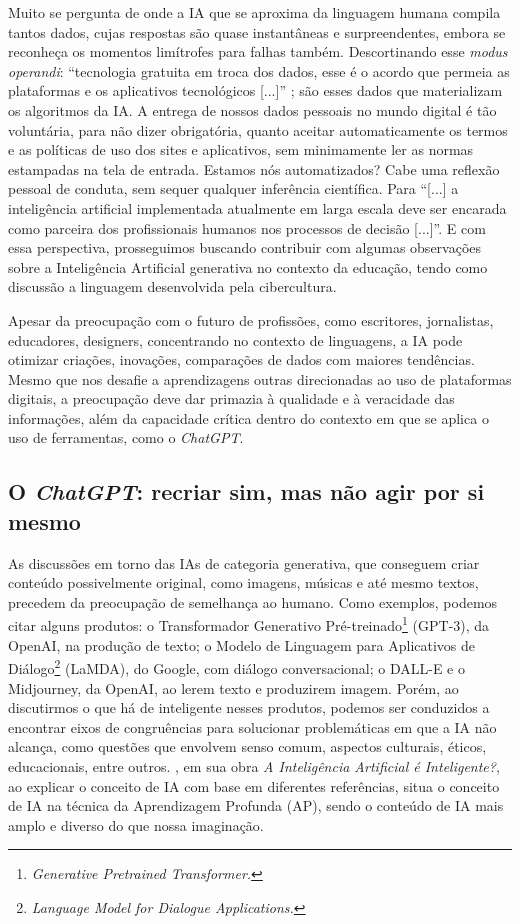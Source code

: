 \documentclass[portuguese]{textolivre}
\begin{document}
Muito se pergunta de onde a IA que se aproxima da linguagem humana compila tantos dados, cujas respostas são quase instantâneas e surpreendentes, embora se reconheça os momentos limítrofes para falhas também. Descortinando esse \emph{modus operandi}: “tecnologia gratuita em troca dos dados, esse é o acordo que permeia as plataformas e os aplicativos tecnológicos [...]” \cite[p. 301]{2022kaufman}; são esses dados que materializam os algoritmos da IA. A entrega de nossos dados pessoais no mundo digital é tão voluntária, para não dizer obrigatória, quanto aceitar automaticamente os termos e as políticas de uso dos sites e aplicativos, sem minimamente ler as normas estampadas na tela de entrada. Estamos nós automatizados? Cabe uma reflexão pessoal de conduta, sem sequer qualquer inferência científica. Para \textcite[p. 43]{2022kaufman} “[...] a inteligência artificial implementada atualmente em larga escala deve ser encarada como parceira dos profissionais humanos nos processos de decisão [...]”. E com essa perspectiva, prosseguimos buscando contribuir com algumas observações sobre a Inteligência Artificial generativa no contexto da educação, tendo como discussão a linguagem desenvolvida pela cibercultura.

Apesar da preocupação com o futuro de profissões, como escritores, jornalistas, educadores, designers, concentrando no contexto de linguagens, a IA pode otimizar criações, inovações, comparações de dados com maiores tendências. Mesmo que nos desafie a aprendizagens outras direcionadas ao uso de plataformas digitais, a preocupação deve dar primazia à qualidade e à veracidade das informações, além da capacidade crítica dentro do contexto em que se aplica o uso de ferramentas, como o \emph{ChatGPT}. 


\subsection{O \emph{ChatGPT}: recriar sim, mas não agir por si mesmo}

As discussões em torno das IAs de categoria generativa, que conseguem criar conteúdo possivelmente original, como imagens, músicas e até mesmo textos, precedem da preocupação de semelhança ao humano. Como exemplos, podemos citar alguns produtos: o Transformador Generativo Pré-treinado\footnote{\emph{Generative Pretrained Transformer.}} (GPT-3), da OpenAI, na produção de texto; o Modelo de Linguagem para Aplicativos de Diálogo\footnote{\emph{Language Model for Dialogue Applications.}} (LaMDA), do Google, com diálogo conversacional; o DALL-E e o Midjourney, da OpenAI, ao lerem texto e produzirem imagem. Porém, ao discutirmos o que há de inteligente nesses produtos, podemos ser conduzidos a encontrar eixos de congruências para solucionar problemáticas em que a IA não alcança, como questões que envolvem senso comum, aspectos culturais, éticos, educacionais, entre outros. \textcite[p. 165]{santaella2023inteligencia}, em sua obra \emph{A Inteligência Artificial é Inteligente?}, ao explicar o conceito de IA com base em diferentes referências, situa o conceito de IA na técnica da Aprendizagem Profunda (AP), sendo o conteúdo de IA mais amplo e diverso do que nossa imaginação. 
\end{document}
